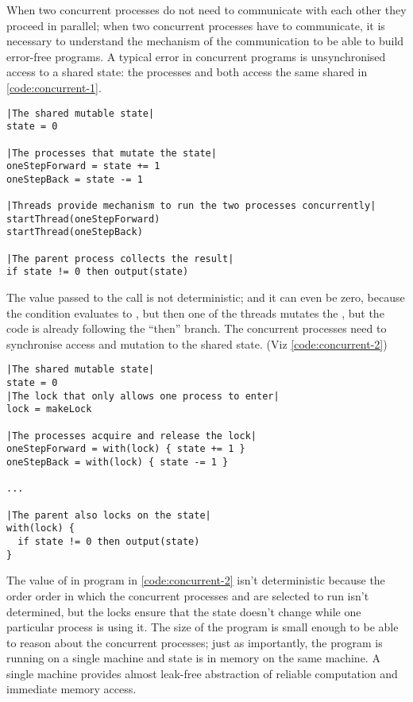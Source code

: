 \documentclass[10 pt, twocolumn]{article}
\begin{document}
When two concurrent processes do not need to communicate with each other they proceed in parallel; when two concurrent processes have to communicate, it is necessary to understand the mechanism of the communication to be able to build error-free programs. A typical error in concurrent programs is unsynchronised access to a shared state: the processes  and  both access the same shared  in \autoref{code:concurrent-1}.

\begin{lstlisting}[caption={Shared mutable state}, label={code:concurrent-1}, language=Pseudo, escapechar=|]
|The shared mutable state|
state = 0

|The processes that mutate the state|
oneStepForward = state += 1
oneStepBack = state -= 1

|Threads provide mechanism to run the two processes concurrently|
startThread(oneStepForward)
startThread(oneStepBack)

|The parent process collects the result|
if state != 0 then output(state)
\end{lstlisting}

The value passed to the  call is not deterministic; and it can even be zero, because the  condition evaluates to , but then one of the threads mutates the , but the code is already following the ``then'' branch. The concurrent processes need to synchronise access and mutation to the shared state. (Viz \autoref{code:concurrent-2})

\begin{lstlisting}[caption={Locked shared mutable state}, label={code:concurrent-2}, language=Pseudo, escapechar=|]
|The shared mutable state|
state = 0
|The lock that only allows one process to enter|
lock = makeLock

|The processes acquire and release the lock|
oneStepForward = with(lock) { state += 1 }
oneStepBack = with(lock) { state -= 1 }

...

|The parent also locks on the state|
with(lock) {
  if state != 0 then output(state)
}
\end{lstlisting}

The value of  in program in \autoref{code:concurrent-2} isn't deterministic because the order order in which the concurrent processes  and  are selected to run isn't determined, but the locks ensure that the state doesn't change while one particular process is using it. The size of the program is small enough to be able to reason about the concurrent processes; just as importantly, the program is running on a single machine and state is in memory on the same machine. A single machine provides almost leak-free abstraction of reliable computation and immediate memory access.
\end{document}
